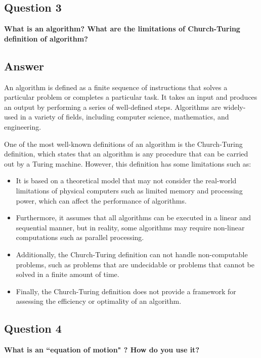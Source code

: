 \documentclass[12]{article}
\begin{document}
\subsection*{Question 3}
\textbf{What is an algorithm? What are the limitations of Church-Turing definition of algorithm?}


\subsection*{Answer}

An algorithm is defined as a finite sequence of instructions that solves a particular problem or completes a particular task. It takes an input and produces an output by performing a series of well-defined steps. Algorithms are widely-used in a variety of fields, including computer science, mathematics, and engineering.

One of the most well-known definitions of an algorithm is the Church-Turing definition, which states that an algorithm is any procedure that can be carried out by a Turing machine. However, this definition has some limitations such as:

\begin{itemize}
\item It is based on a theoretical model that may not consider the real-world limitations of physical computers such as limited memory and processing power, which can affect the performance of algorithms.

\item Furthermore, it assumes that all algorithms can be executed in a linear and sequential manner, but in reality, some algorithms may require non-linear computations such as parallel processing.

\item Additionally, the Church-Turing definition can not handle non-computable problems, such as problems that are undecidable or problems that cannot be solved in a finite amount of time.

\item 
Finally, the Church-Turing definition does not provide a framework for assessing the efficiency or optimality of an algorithm.

\end{itemize}



\subsection*{Question 4}
\textbf{What is an ``equation of motion" ? How do you use it?
}
\end{document}
